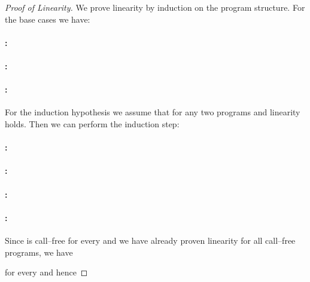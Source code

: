 \begin{proof}[Proof of Linearity]
We prove linearity by induction on the program structure.
For the base cases we have:
\paragraph{:}
\baselineskip
\normalsize
\paragraph{:}

\paragraph{:}
\baselineskip

\normalsize
For the induction hypothesis we assume that for any two programs  and  linearity holds.
Then we can perform the induction step:
\paragraph{:}

\paragraph{:}

\paragraph{:}

\paragraph{:}
\baselineskip

\normalsize
Since  is call--free for every  and we have already proven linearity for all call--free programs, we have

for every  and hence
\baselineskip
\normalsize
\end{proof}





